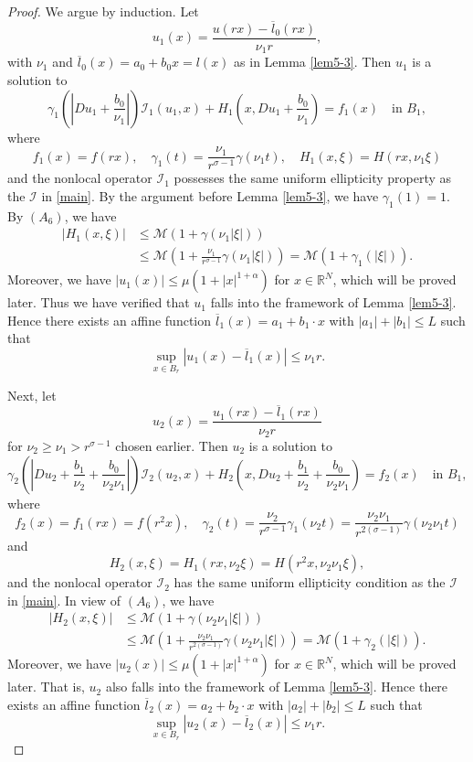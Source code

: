 \documentclass[11pt,reqno]{amsart}
\numberwithin{equation}{section}
\begin{document}
\begin{proof}
We argue by induction. Let
$$
u_1(x)=\frac{u(rx)-\overline{l}_0(rx)}{\nu_1r},
$$
with $\nu_1$ and $\overline{l}_0(x)=a_0+b_0x=l(x)$ as in Lemma \ref{lem5-3}. Then $u_1$ is a solution to
$$
\gamma_1\left(\left|Du_1+\frac{b_0}{\nu_1}\right|\right)\mathcal{I}_1(u_1,x)+H_1\left(x,Du_1+\frac{b_0}{\nu_1}\right)=f_1(x) \quad\text{in } B_1,
$$
where
$$
f_1(x)=f(rx), \quad \gamma_1(t)=\frac{\nu_1}{r^{\sigma-1}}\gamma(\nu_1t), \quad H_1(x,\xi)=H(rx,\nu_1\xi)
$$
and the nonlocal operator $\mathcal{I}_1$ possesses the same uniform ellipticity property as the $\mathcal{I}$ in \eqref{main}.
By the argument before Lemma \ref{lem5-3}, we have $\gamma_1(1)=1$. By $(A_6)$, we have
\begin{align*}
|H_1(x,\xi)|&\le \mathcal{M}(1+\gamma(\nu_1|\xi|))\\
&\le \mathcal{M}\left(1+\frac{\nu_1}{r^{\sigma-1}}\gamma(\nu_1|\xi|)\right)=\mathcal{M}(1+\gamma_1(|\xi|)).
\end{align*}
Moreover, we have $|u_1(x)|\le \mu(1+|x|^{1+\alpha})$ for $x\in\mathbb{R}^N$, which will be proved later.
Thus we have verified that $u_1$ falls into the framework of Lemma \ref{lem5-3}. Hence there exists an affine function $\overline{l}_1(x)=a_1+b_1\cdot x$ with $|a_1|+|b_1|\le L$ such that
$$
\sup_{x\in B_{r}}|u_1(x)-\overline{l}_1(x)|\leq \nu_1r.
$$

Next, let
$$
u_2(x)=\frac{u_1(rx)-\overline{l}_1(rx)}{\nu_2r}
$$
for $\nu_2\ge\nu_1>r^{\sigma-1}$ chosen earlier. Then $u_2$ is a solution to
$$
\gamma_2\left(\left|Du_2+\frac{b_1}{\nu_2}+\frac{b_0}{\nu_2\nu_1}\right|\right)\mathcal{I}_2(u_2,x)+H_2\left(x,Du_2+\frac{b_1}{\nu_2}
+\frac{b_0}{\nu_2\nu_1}\right)=f_2(x) \quad\text{in } B_1,
$$
where
$$
f_2(x)=f_1(rx)=f(r^2x), \quad \gamma_2(t)=\frac{\nu_2}{r^{\sigma-1}}\gamma_1(\nu_2t)=\frac{\nu_2\nu_1}{r^{2(\sigma-1)}}\gamma(\nu_2\nu_1t)
$$
and
$$
 H_2(x,\xi)=H_1(rx,\nu_2\xi)=H(r^2x,\nu_2\nu_1\xi),
$$
and the nonlocal operator $\mathcal{I}_2$ has the same uniform ellipticity condition as the $\mathcal{I}$ in \eqref{main}. In view of $(A_6)$, we have
\begin{align*}
|H_2(x,\xi)|&\le \mathcal{M}(1+\gamma(\nu_2\nu_1|\xi|))\\
&\le\mathcal{M}\left(1+\frac{\nu_2\nu_1}{r^{2(\sigma-1)}}\gamma(\nu_2\nu_1|\xi|)\right)=\mathcal{M}(1+\gamma_2(|\xi|)).
\end{align*}
Moreover, we have $|u_2(x)|\le \mu(1+|x|^{1+\alpha})$ for $x\in\mathbb{R}^N$, which will be proved later. That is, $u_2$ also falls into the framework of Lemma \ref{lem5-3}.
Hence there exists an affine function  $\overline{l}_2(x)=a_2+b_2\cdot x$ with $|a_2|+|b_2|\le L$ such that
$$
\sup_{x\in B_{r}}|u_2(x)-\overline{l}_2(x)|\leq \nu_1r.
$$


\end{proof}
\end{document}
